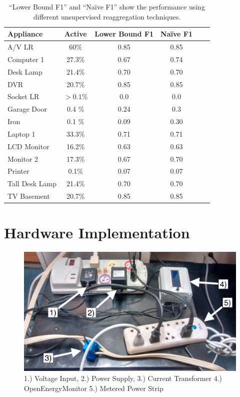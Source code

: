 \begin{table}[]
\setlength{\tabcolsep}{3pt}
\centering
\begin{tabular}{lccccc}
\hline
Appliance      & Active            & Lower Bound F1 & Na\"ive F1 \\ \hline
A/V LR         & 60\%              & 0.85        & 0.85         \\
Computer 1     & 27.3\%            & 0.67        & 0.74      \\
Desk Lamp      & 21.4\%            & 0.70        & 0.70     \\
DVR            & 20.7\%            & 0.85         & 0.85      \\
Socket LR      & $>0.1\%$ & 0.0       & 0.0      \\
Garage Door    & 0.4 \%            & 0.24          & 0.3  \\
Iron           & 0.1 \%            & 0.09        & 0.30   \\
Laptop 1       & 33.3\%            & 0.71        & 0.71   \\
LCD Monitor    & 16.2\%            & 0.63        & 0.63  \\
Monitor 2      & 17.3\%            & 0.67        & 0.70  \\
Printer        & 0.1\%             & 0.07           & 0.07 \\
Tall Desk Lamp & 21.4\%            & 0.70        & 0.70   \\
TV Basement    & 20.7\%            & 0.85        & 0.85   \\ \hline
\end{tabular}
\caption[BOLT: Unsupervised performance comparison]{ ``Lower Bound F1'' and ``Na\"ive F1'' show the performance using different unsupervised reaggregation techniques.}
\label{results_unsup}
\end{table}

\newpage
\section{Hardware Implementation}

\begin{figure}[!ht]
\includegraphics[width=0.85\linewidth]{bolt/OEM.jpg}
\caption[BOLT: The OpenEnergyMonitor setup.]{1.) Voltage Input, 2.) Power Supply, 3.) Current Transformer 4.) OpenEnergyMonitor 5.) Metered Power Strip }
\label{fg:oem}
\end{figure}

